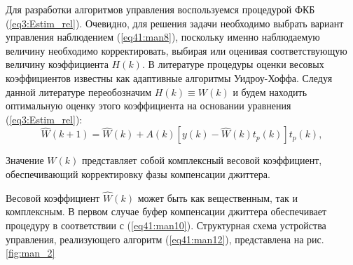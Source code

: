 Для разработки алгоритмов управления воспользуемся процедурой ФКБ (\ref{eq3:Estim_rel}). Очевидно, для решения задачи необходимо выбрать вариант управления наблюдением (\ref{eq41:man8}),
поскольку именно наблюдаемую величину необходимо корректировать, выбирая или оценивая соответствующую величину коэффициента $H(k)$. 
В литературе \cite{windrow,monzigo} процедуры оценки весовых коэффициентов известны как адаптивные алгоритмы Уидроу-Хоффа. 
Следуя данной литературе переобозначим $H(k)\equiv W(k)$ и будем находить оптимальную оценку этого коэффициента на основании уравнения (\ref{eq3:Estim_rel}):
\begin{equation}\label{eq41:man12}
\hat W(k+1)=\hat W(k)+A(k)[y(k)-\hat W(k)t_{p}(k)]t_{p}(k),
\end{equation}

Значение $W(k)$ представляет собой комплексный весовой коэффициент, обеспечивающий корректировку фазы компенсации джиттера.

Весовой коэффициент $\hat W(k)$ может быть как вещественным, так и комплексным. 
В первом случае буфер компенсации джиттера обеспечивает процедуру в соответствии с (\ref{eq41:man10}). 
Структурная схема устройства управления, реализующего алгоритм (\ref{eq41:man12}), представлена на рис. \ref{fig:man_2}

